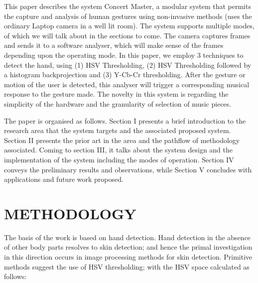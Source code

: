 \documentclass[letterpaper, 10 pt, twoside, conference]{ieeeconf}
\begin{document}
This paper describes the system Concert Master, a modular system that permits the capture and analysis of human gestures using non-invasive methods (uses the ordinary Laptop camera in a well lit room).
The system supports multiple modes, of which we will talk about in the sections to come. The camera
captures frames and sends it to a software analyser, which will make sense of the frames depending
upon the operating mode. In this paper, we employ 3 techniques to detect the hand, using (1) HSV Thresholding,
(2) HSV Thresholding followed by a histogram backprojection and (3) Y-Cb-Cr thresholding. After the gesture or motion of the user is detected, this analyser will
trigger a corresponding musical response to the gesture made. The novelty in this system is regarding the
simplicity of the hardware and the granularity of selection of music pieces.

The paper is organised as follows. Section I presents a brief introduction to the research area that the system targets and
the associated proposed system. Section II presents the prior art in the area and the
pathflow of methodology associated. Coming to section III, it talks about the system design
and the implementation of the system including the modes of operation. Section IV conveys the
preliminary results and observations, while Section V concludes with applications and future
work proposed.

\section{METHODOLOGY}
\label{sec:pagestyle}

The basis of the work is based on hand detection. Hand detection in the absence of
other body parts resolves to skin detection; and hence the primal investigation in this
direction occurs in image processing methods for skin detection. Primitive methods
suggest the use of HSV thresholding; with the HSV space calculated as follows:
\end{document}

